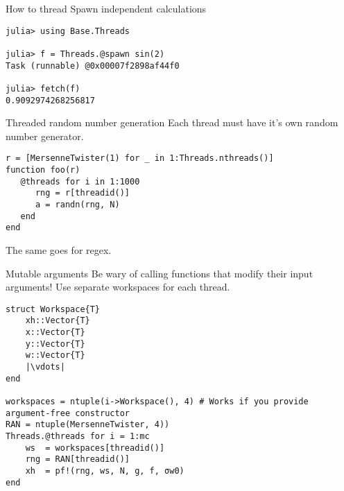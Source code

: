 \documentclass[10pt]{beamer}
\begin{document}
\begin{frame}[fragile]{How to thread}{}
    Spawn independent calculations
    \begin{verbatim}
julia> using Base.Threads

julia> f = Threads.@spawn sin(2)
Task (runnable) @0x00007f2898af44f0

julia> fetch(f)
0.9092974268256817
    \end{verbatim}


\end{frame}


\begin{frame}[fragile]{Threaded random number generation}{}
Each thread must have it's own random number generator.
    \begin{verbatim}
r = [MersenneTwister(1) for _ in 1:Threads.nthreads()]
function foo(r)
   @threads for i in 1:1000
      rng = r[threadid()]
      a = randn(rng, N)
   end
end
    \end{verbatim}
    The same goes for regex.
\end{frame}


\begin{frame}[fragile]{Mutable arguments}{}
    Be wary of calling functions that modify their input arguments! Use separate workspaces for each thread.
\begin{verbatim}
struct Workspace{T}
    xh::Vector{T}
    x::Vector{T}
    y::Vector{T}
    w::Vector{T}
    |\vdots|
end

workspaces = ntuple(i->Workspace(), 4) # Works if you provide argument-free constructor
RAN = ntuple(MersenneTwister, 4))
Threads.@threads for i = 1:mc
	ws  = workspaces[threadid()]
	rng = RAN[threadid()]
	xh  = pf!(rng, ws, N, g, f, σw0)
end
\end{verbatim}

\end{frame}
\end{document}
